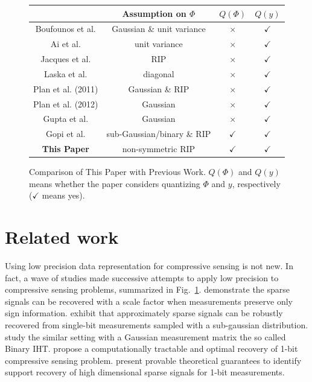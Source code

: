\documentclass{article}
\begin{document}
\begin{figure}[t]
\small
\centering
\begin{tabular}{c|c|cc}
\hline
                   & Assumption on $\Phi$ & $Q(\Phi)$ & $Q(y)$ \\
\hline
 Boufounos et al.
 & Gaussian \& unit variance &$\times$ & $\checkmark$\\
 Ai et al.         & unit variance &$\times$ & $\checkmark$\\
 Jacques et al.     &  RIP & $\times$& $\checkmark$\\
 Laska et al.     & diagonal &$\times$ & $\checkmark$\\
 Plan et al. (2011)     & Gaussian \& RIP &$\times$ & $\checkmark$\\
 Plan et al. (2012)      & Gaussian &$\times$ & $\checkmark$\\
 Gupta et al.     & Gaussian &$\times$ & $\checkmark$\\
 Gopi et al.       & sub-Gaussian/binary \& RIP &$\checkmark$ & $\checkmark$\\
\hline
  {\bf This Paper}                & non-symmetric RIP & $\checkmark$ & $\checkmark$ \\
\hline
\end{tabular}
\caption{Comparison of This Paper with Previous Work. $Q(\Phi)$ and $Q(y)$ means whether
the paper considers quantizing $\Phi$ and $y$,
respectively ($\checkmark$ means yes).}
\label{tab:cs}
\end{figure}



\section{Related work}\label{section_related_work}

Using low precision data representation for compressive sensing
is not new. In fact, a wave of studies made successive attempts to apply low precision  
to compressive sensing problems, summarized in
Fig.~\ref{tab:cs}. \cite{boufounos20091bitcs} demonstrate the sparse signals can be recovered with a scale factor when measurements preserve only sign information. \cite{ai20121bitcs, davenport20121bit} exhibit that approximately sparse signals can be robustly recovered from single-bit measurements sampled with a sub-gaussian distribution. \cite{jacques20111bit, laska20111bitcs} study the similar setting with a Gaussian measurement matrix the so called Binary IHT. \cite{plan20111bitcs, plan20121bitcs} propose a computationally tractable and optimal recovery of 1-bit compressive sensing problem. \cite{recht20121bitcs, gopi20131bitcs} present provable theoretical guarantees to identify support recovery of high dimensional sparse signals for 1-bit measurements. 
\end{document}
